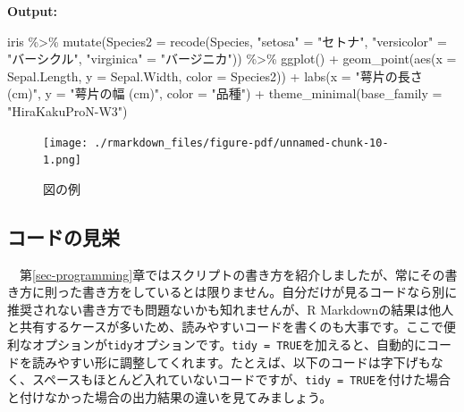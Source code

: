 \documentclass[
  a4paper,
  pandoc,
  ja=standard,
  jafont=haranoaji]{bxjsbook}
\newenvironment{Shaded}{\begin{snugshade}}{\end{snugshade}}
\newcommand{\AttributeTok}[1]{\textcolor[rgb]{0.00,0.48,0.65}{#1}}
\newcommand{\FunctionTok}[1]{\textcolor[rgb]{0.28,0.35,0.67}{#1}}
\newcommand{\NormalTok}[1]{\textcolor[rgb]{0.00,0.48,0.65}{#1}}
\newcommand{\OtherTok}[1]{\textcolor[rgb]{0.00,0.48,0.65}{#1}}
\newcommand{\SpecialCharTok}[1]{\textcolor[rgb]{0.37,0.37,0.37}{#1}}
\newcommand{\StringTok}[1]{\textcolor[rgb]{0.13,0.47,0.30}{#1}}
\begin{document}
\textbf{Output:}

\begin{Shaded}
\begin{Highlighting}[]
\NormalTok{iris }\SpecialCharTok{\%\textgreater{}\%}
  \FunctionTok{mutate}\NormalTok{(}\AttributeTok{Species2 =} \FunctionTok{recode}\NormalTok{(Species,}
                           \StringTok{"setosa"}     \OtherTok{=} \StringTok{"セトナ"}\NormalTok{,}
                           \StringTok{"versicolor"} \OtherTok{=} \StringTok{"バーシクル"}\NormalTok{,}
                           \StringTok{"virginica"}  \OtherTok{=} \StringTok{"バージニカ"}\NormalTok{)) }\SpecialCharTok{\%\textgreater{}\%}
  \FunctionTok{ggplot}\NormalTok{() }\SpecialCharTok{+}
  \FunctionTok{geom\_point}\NormalTok{(}\FunctionTok{aes}\NormalTok{(}\AttributeTok{x =}\NormalTok{ Sepal.Length, }\AttributeTok{y =}\NormalTok{ Sepal.Width, }\AttributeTok{color =}\NormalTok{ Species2)) }\SpecialCharTok{+}
  \FunctionTok{labs}\NormalTok{(}\AttributeTok{x =} \StringTok{"萼片の長さ (cm)"}\NormalTok{, }\AttributeTok{y =} \StringTok{"萼片の幅 (cm)"}\NormalTok{, }\AttributeTok{color =} \StringTok{"品種"}\NormalTok{) }\SpecialCharTok{+}
  \FunctionTok{theme\_minimal}\NormalTok{(}\AttributeTok{base\_family =} \StringTok{"HiraKakuProN{-}W3"}\NormalTok{)}
\end{Highlighting}
\end{Shaded}

\begin{figure}[H]

{\centering \texttt{[image: ./rmarkdown\_files/figure-pdf/unnamed-chunk-10-1.png]}

}

\caption{図の例}

\end{figure}

\hypertarget{ux30b3ux30fcux30c9ux306eux898bux6804}{%
\subsection{コードの見栄}\label{ux30b3ux30fcux30c9ux306eux898bux6804}}

　第\ref{sec-programming}章ではスクリプトの書き方を紹介しましたが、常にその書き方に則った書き方をしているとは限りません。自分だけが見るコードなら別に推奨されない書き方でも問題ないかも知れませんが、R
Markdownの結果は他人と共有するケースが多いため、読みやすいコードを書くのも大事です。ここで便利なオプションが\texttt{tidy}オプションです。\texttt{tidy\ =\ TRUE}を加えると、自動的にコードを読みやすい形に調整してくれます。たとえば、以下のコードは字下げもなく、スペースもほとんど入れていないコードですが、\texttt{tidy\ =\ TRUE}を付けた場合と付けなかった場合の出力結果の違いを見てみましょう。
\end{document}
